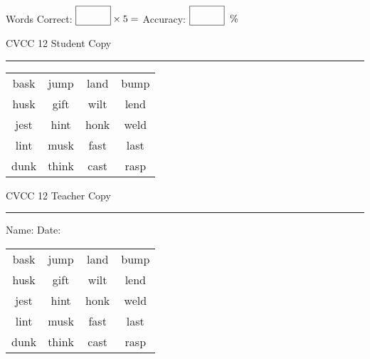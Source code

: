 \documentclass{memoir}
\begin{document}
\small

Words Correct: $\fbox{\phantom{\huge 100}} \times 5 = $ Accuracy: $\fbox{\phantom{\huge 100}}\;\; \%$ 

\vfill

\newpage


\footnotesize \noindent
CVCC 12 \hfill Student Copy
\smallskip
\hrule

\Large

\setlength{\tabcolsep}{14pt}
\def\arraystretch{3}

{\selectfont


\begin{vplace}[0.5]
\begin{center}
\begin{tabular}{cccc}
bask & jump & land & bump \\
husk & gift & wilt & lend \\
jest & hint & honk & weld \\
lint & musk & fast & last \\
dunk & think & cast & rasp \\
\end{tabular}
\end{center}
\end{vplace}

}

\newpage

\footnotesize \noindent
CVCC 12 \hfill Teacher Copy
\smallskip
\hrule

\small

\vfill

\noindent
Name: \underline{\hspace{1.75in}} \hfill Date: \underline{\hspace{1in}}

\Large

{\selectfont


\begin{vplace}[0.5]
\begin{center}
\begin{tabular}{cccc}
bask & jump & land & bump \\
husk & gift & wilt & lend \\
jest & hint & honk & weld \\
lint & musk & fast & last \\
dunk & think & cast & rasp \\
\end{tabular}
\end{center}
\end{vplace}



}
\end{document}
